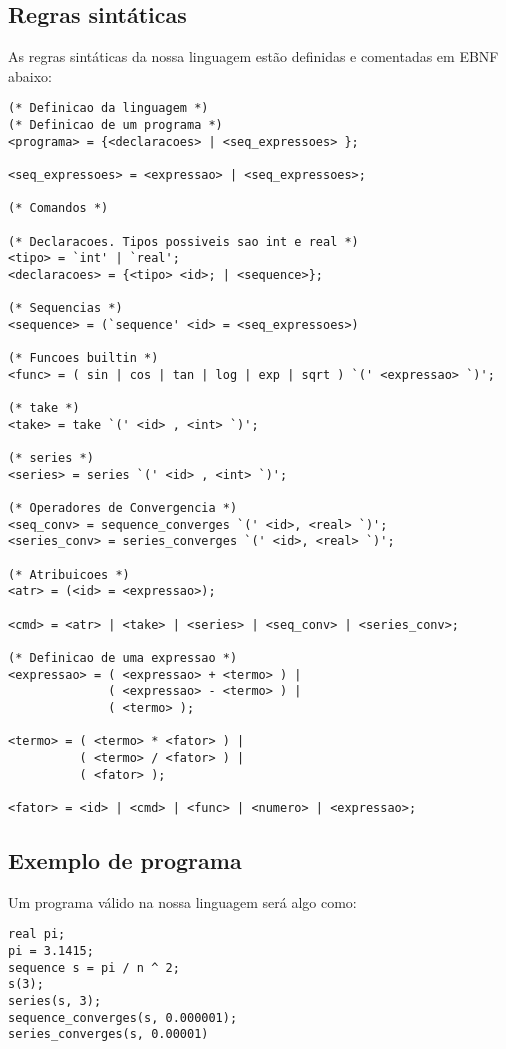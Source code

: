 \documentclass[a4 paper, 12pt]{article}
\begin{document}
\subsection{Regras sint\'aticas}
As regras sint\'aticas da nossa linguagem est\~ao definidas e
comentadas em EBNF abaixo:
\begin{verbatim}
(* Definicao da linguagem *)
(* Definicao de um programa *)
<programa> = {<declaracoes> | <seq_expressoes> };

<seq_expressoes> = <expressao> | <seq_expressoes>;

(* Comandos *)

(* Declaracoes. Tipos possiveis sao int e real *)
<tipo> = `int' | `real';
<declaracoes> = {<tipo> <id>; | <sequence>};

(* Sequencias *)
<sequence> = (`sequence' <id> = <seq_expressoes>)

(* Funcoes builtin *)
<func> = ( sin | cos | tan | log | exp | sqrt ) `(' <expressao> `)';

(* take *)
<take> = take `(' <id> , <int> `)';

(* series *)
<series> = series `(' <id> , <int> `)';

(* Operadores de Convergencia *)
<seq_conv> = sequence_converges `(' <id>, <real> `)';
<series_conv> = series_converges `(' <id>, <real> `)';

(* Atribuicoes *)
<atr> = (<id> = <expressao>);

<cmd> = <atr> | <take> | <series> | <seq_conv> | <series_conv>;

(* Definicao de uma expressao *)
<expressao> = ( <expressao> + <termo> ) |
              ( <expressao> - <termo> ) |
              ( <termo> );

<termo> = ( <termo> * <fator> ) |
          ( <termo> / <fator> ) |
          ( <fator> );

<fator> = <id> | <cmd> | <func> | <numero> | <expressao>;

\end{verbatim}

\subsection{Exemplo de programa}
Um programa v\'alido na
nossa linguagem ser\'a algo como:
\begin{verbatim}
real pi;
pi = 3.1415;
sequence s = pi / n ^ 2;
s(3);
series(s, 3);
sequence_converges(s, 0.000001);
series_converges(s, 0.00001)
\end{verbatim}
\end{document}
